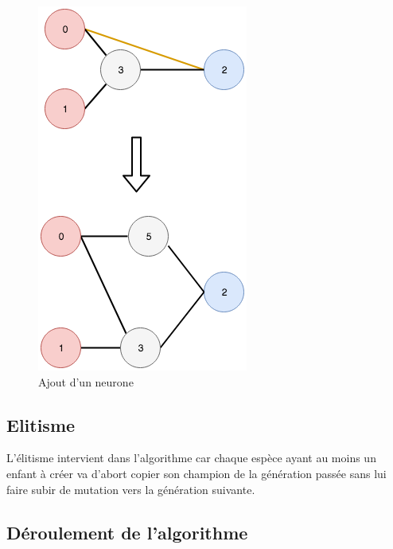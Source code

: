 \documentclass{article}
\begin{document}
\begin{figure}[H]
\begin{center}
	\includegraphics[scale=0.4]{addnode.png}
	\caption{Ajout d'un neurone}
\end{center}
\end{figure}

\subsection{Elitisme}

L'élitisme intervient dans l'algorithme car chaque espèce ayant au moins un enfant à créer va d'abort copier son champion de la génération passée sans lui faire subir de mutation vers la génération suivante.

\subsection{Déroulement de l'algorithme}
\end{document}
